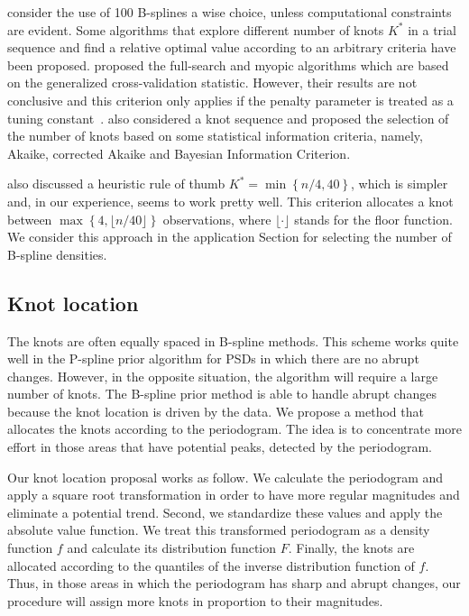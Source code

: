 \documentclass[aps,reprint,amsmath,amssymb,showpacs,showkeys]{revtex4-1}%
\begin{document}
\cite{Eilers2015} consider the use of 100 B-splines a wise choice, unless computational constraints are evident.  Some algorithms that explore different number of knots $K^*$ in a trial sequence and find a relative optimal value according to an arbitrary criteria have been proposed. \cite{Ruppert2002} proposed the full-search and myopic algorithms which are based on the generalized cross-validation statistic.  However, their results are not conclusive and this criterion only applies if the penalty parameter is treated as a tuning constant~\cite{Kauermann2011}.  \cite{Likhachev2017} also considered a knot sequence and proposed the selection of the number of knots based on some statistical information criteria, namely, Akaike, corrected Akaike and Bayesian Information Criterion.

\cite{Ruppert2002} also discussed a heuristic rule of thumb $K^* = \min\left\{n/4, 40\right\}$, which is simpler and, in our experience, seems to work pretty well.  This criterion allocates a knot between $\max\left\{ 4, \lfloor n/40 \rfloor \right\}$ observations, where $\lfloor \cdot \rfloor$ stands for the floor function.  We consider this approach in the application Section for selecting the number of B-spline densities.


\subsection*{Knot location}

The knots are often equally spaced in B-spline methods.  This scheme works quite well in the P-spline prior algorithm for PSDs in which there are no abrupt changes.  However, in the opposite situation, the algorithm will require a large number of knots.  The B-spline prior method is able to handle abrupt changes because the knot location is driven by the data.  We propose a method that allocates the knots according to the periodogram.  The idea is to concentrate more effort in those areas that have potential peaks, detected by the periodogram.  

Our knot location proposal works as follow.  We calculate the periodogram and apply a square root transformation in order to have more regular magnitudes and eliminate a potential trend.  Second, we standardize these values and apply the absolute value function.  We treat this transformed periodogram as a density function $f$ and calculate its distribution function $F$.  Finally, the knots are allocated according to the quantiles of the inverse distribution function of $f$.  Thus, in those areas in which the periodogram has sharp and abrupt changes, our procedure will assign more knots in proportion to their magnitudes.
\end{document}
